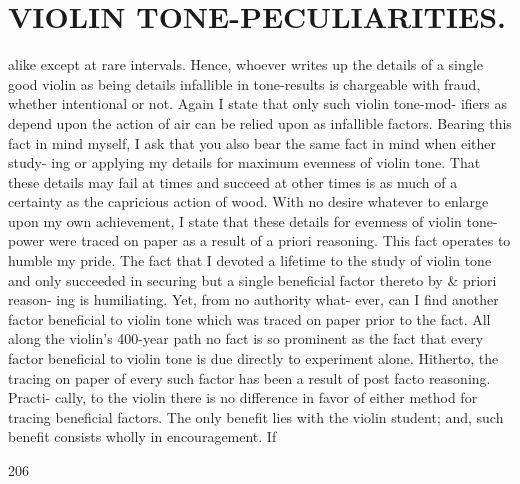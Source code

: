 \documentclass{article}
\begin{document}
\section*{VIOLIN TONE-PECULIARITIES.}
alike except at rare intervals. Hence, whoever writes up the details of a single good violin as being details infallible in tone-results is chargeable with fraud, whether intentional or not. Again I state that only such violin tone-mod- ifiers as depend upon the action of air can be relied upon as infallible factors. Bearing this fact in mind myself, I ask that you also bear the same fact in mind when either study- ing or applying my details for maximum evenness of violin tone. That these details may fail at times and succeed at other times is as much of a certainty as the capricious action of wood. With no desire whatever to enlarge upon my own achievement, I state that these details for evenness of violin tone- power were traced on paper as a result of a priori reasoning. This fact operates to humble my pride. The fact that I devoted a lifetime to the study of violin tone and only succeeded in securing but a single beneficial factor thereto by \& priori reason- ing is humiliating. Yet, from no authority what- ever, can I find another factor beneficial to violin tone which was traced on paper prior to the fact. All along the violin's 400-year path no fact is so prominent as the fact that every factor beneficial to violin tone is due directly to experiment alone. Hitherto, the tracing on paper of every such factor has been a result of post facto reasoning. Practi- cally, to the violin there is no difference in favor of either method for tracing beneficial factors. The only benefit lies with the violin student; and, such benefit consists wholly in encouragement. If

206
\end{document}
